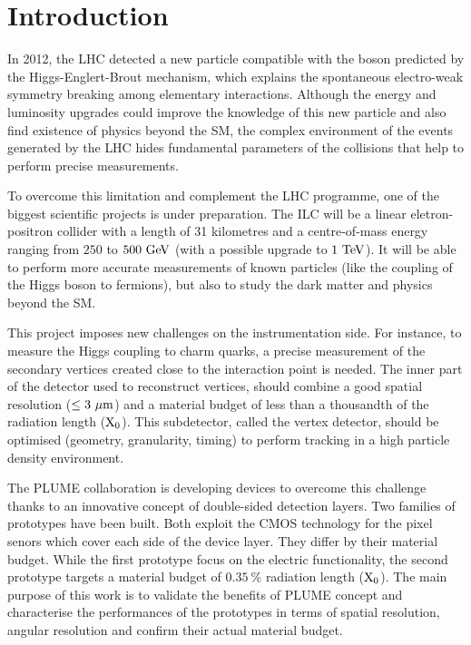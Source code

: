 \chapter{Introduction}

  In 2012, the \gls{LHC} detected a new particle compatible with the boson predicted by the Higgs-Englert-Brout mechanism, which explains the spontaneous electro-weak symmetry breaking among elementary interactions.
  Although the energy and luminosity upgrades could improve the knowledge of this new particle and also find existence of physics beyond the \gls{SM}, the complex environment of the events generated by the \gls{LHC} hides fundamental parameters of the collisions that help to perform precise measurements.

  To overcome this limitation and complement the \gls{LHC} programme, one of the biggest scientific projects is under preparation. 
  The \gls{ILC} will be a linear eletron-positron collider with a length of 31 kilometres and a centre-of-mass energy ranging from  $250$ to $500~\rm{GeV}$ (with a possible upgrade to $1~\rm{TeV}$). 
  It will be able to perform more accurate measurements of known particles (like the coupling of the Higgs boson to fermions), but also to study the dark matter and physics beyond the \gls{SM}. 
  
  This project imposes new challenges on the instrumentation side. 
  For instance, to measure the Higgs coupling to charm quarks, a precise measurement of the secondary vertices created close to the interaction point is needed.
  The inner part of the detector used to reconstruct vertices, should combine a good spatial resolution ($\leq 3~\rm{\mu m}$) and a material budget of less than a thousandth of the radiation length ($\rm{X_0}$).
  This subdetector, called the vertex detector, should be optimised (geometry, granularity, timing) to perform tracking in a high particle density environment.
  
  The \gls{PLUME} collaboration is developing devices to overcome this challenge thanks to an innovative concept of double-sided detection layers.
  Two families of prototypes have been built.
  Both exploit the \gls{CMOS} technology for the pixel senors which cover each side of the device layer.
  They differ by their material budget.
  While the first prototype focus on the electric functionality, the second prototype targets a material budget of $0.35~\%$ radiation length ($\rm{X_{0}}$).
  The main purpose of this work is to validate the benefits of \gls{PLUME} concept and characterise the performances of the prototypes in terms of spatial resolution, angular resolution and confirm their actual material budget.
  
